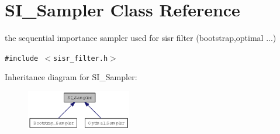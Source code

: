 \hypertarget{class_s_i___sampler}{
\section{SI\_\-Sampler Class Reference}
\label{class_s_i___sampler}
}
the sequential importance sampler used for sisr filter (bootstrap,optimal ...)  


{\tt \#include $<$sisr\_\-filter.h$>$}

Inheritance diagram for SI\_\-Sampler:\nopagebreak
\begin{figure}[H]
\begin{center}
\leavevmode
\includegraphics[width=130pt]{class_s_i___sampler__inherit__graph}
\end{center}
\end{figure}
